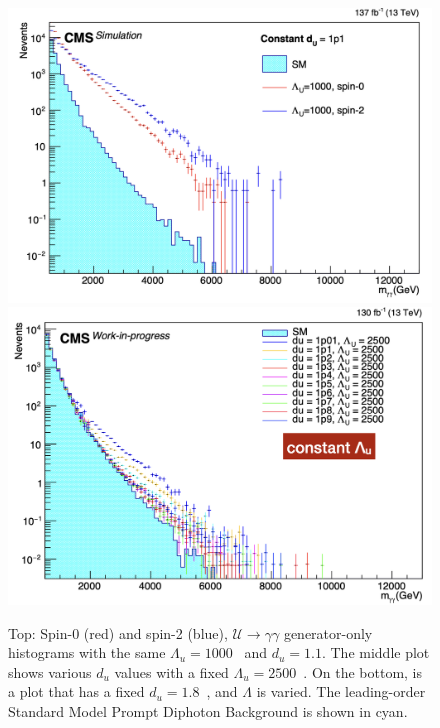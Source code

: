 \begin{figure}[!htbp]
\caption{Top: Spin-0 (red) and spin-2 (blue), $\mathcal{U}{\rightarrow}\gamma\gamma$ generator-only histograms with the same $\Lambda_u = 1000$~\GeV{} and $d_{u} = 1.1$.
The middle plot shows various $d_u$ values with a fixed $\Lambda_u = 2500$~\GeV. On the bottom, is a plot that has a fixed $d_u = 1.8$~\GeV, and $\Lambda$ is varied. The leading-order Standard Model Prompt Diphoton Background is shown in cyan.}
	\centering
    \includegraphics[scale=0.34]{fig/UnparticlesSpinSensitivity.png}
    \includegraphics[scale=0.4]{fig/UnparticlesConstantLambda_U.png}

\end{figure}
